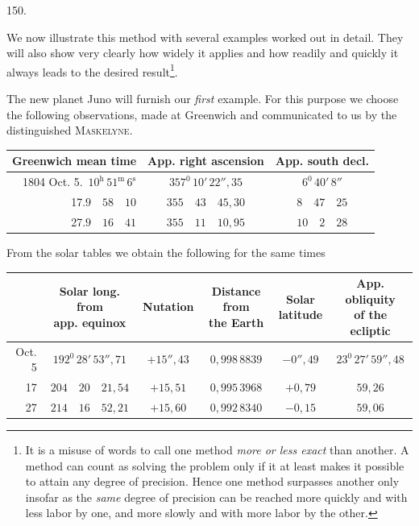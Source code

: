 \par{}\medskip
\begin{center}\hypertarget{native-200-article150}{}150.\end{center}
We now illustrate this method with several examples worked out in detail. They will also show very clearly how widely it applies and how readily and quickly it always leads to the desired result\footnote{It is a misuse of words to call one method \textit{more or less exact} than another. A method can count as solving the problem only if it at least makes it possible to attain any degree of precision. Hence one method surpasses another only insofar as the \textit{same} degree of precision can be reached more quickly and with less labor by one, and more slowly and with more labor by the other.}.

The new planet Juno will furnish our \textit{first} example. For this purpose we choose the following observations, made at Greenwich and communicated to us by the distinguished \textsc{Maskelyne}.
\begin{center}
\small\setlength{\tabcolsep}{5pt}\renewcommand{\arraystretch}{1.2}
\begin{tabular}{|r|c|c|}
\hline
Greenwich mean time & App. right ascension & App. south decl.\\
\hline
1804 Oct. 5.\ $10^{\mathrm{h}}\,51^{\mathrm{m}}\,6^{\mathrm{s}}$ & $357^{0}\,10'\,22''{,}35$ & $6^{0}\,40'\,8''$\\
17.\quad $9\quad58\quad10$ & $355\quad43\quad45{,}30$ & $8\quad47\quad25$\\
27.\quad $9\quad16\quad41$ & $355\quad11\quad10{,}95$ & $10\quad2\quad28$\\
\hline
\end{tabular}
\end{center}

From the solar tables we obtain the following for the same times
\begin{center}
\footnotesize\setlength{\tabcolsep}{3pt}\renewcommand{\arraystretch}{1.2}
\begin{tabular}{|r|c|c|c|c|c|}
\hline
 & \shortstack{Solar long. from\\app. equinox} & Nutation & \shortstack{Distance from\\the Earth} & \shortstack{Solar\\latitude} & \shortstack{App. obliquity\\of the ecliptic}\\
\hline
Oct. 5 & $192^{0}\,28'\,53''{,}71$ & $+15''{,}43$ & $0{,}998\,8839$ & $-0''{,}49$ & $23^{0}\,27'\,59''{,}48$\\
17 & $204\quad20\quad21{,}54$ & $+15{,}51$ & $0{,}995\,3968$ & $+0{,}79$ & $59{,}26$\\
27 & $214\quad16\quad52{,}21$ & $+15{,}60$ & $0{,}992\,8340$ & $-0{,}15$ & $59{,}06$\\
\hline
\end{tabular}
\end{center}

